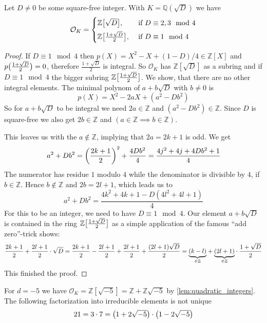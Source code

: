 \begin{lemma}\label{lem:quadratic_integers}
	Let $D\neq 0$ be some square-free integer.
	With $K=\mathbb{Q}(\sqrt{D})$ we have
	\[
		\mathcal{O}_K = \begin{cases}
			\mathbb{Z}\benbrace[\big]{\sqrt{D}}, &\text{ if }D \equiv 2,3 \mod 4\\[1ex]
			\mathbb{Z}\benbrace[\big]{\frac{1+ \sqrt{D}}{2}}, &\text{ if } D \equiv 1 \mod 4
		\end{cases}
	\]
\end{lemma}
\begin{proof}
	If $D \equiv 1 \mod 4$ then $p(X)= X^2 -X + (1-D)/4 \in \mathbb{Z}[X]$ and $p \enbrace[\big]{\frac{1+ \sqrt{D}}{2}}=0$, therefore $\frac{1+ \sqrt{D}}{2}$ is integral.
	So $\mathcal{O}_K$ has $\mathbb{Z}[\sqrt{D}]$ as a subring and if $D \equiv 1 \mod 4$ the bigger subring $\mathbb{Z}\benbrace[\big]{\frac{1+ \sqrt{D}}{2}}$.
	We show, that there are no other integral elements.
	The minimal polynom of $a + b \sqrt{D}$ with $b\neq 0$ is
	\[
		p(X) = X^2 -2aX + (a^2 - Db^2)
	\]
	So for $a +b \sqrt{D}$ to be integral we need $2a \in \mathbb{Z}$ and $(a^2 - Db^2) \in \mathbb{Z}$.
	Since $D$ is square-free we also get $2b \in \mathbb{Z}$ and $(a \in \mathbb{Z} \implies b \in \mathbb{Z})$.

	This leaves us with the $a \notin \mathbb{Z}$, implying that $2a=2k+1$ is odd.
	We get
	\[
		a^2 + Db^2 = \enbrace*{\frac{2k+1}{2}}^2 + \frac{4Db^2}{4} = \frac{4j^2 +4j + 4 Db^2 + 1}{4}
	\]
	The numerator has residue $1$ modulo $4$ while the denominator is divisible by $4$, if $b \in \mathbb{Z}$.
	Hence $b \notin \mathbb{Z}$ and $2b =2 l + 1$, which leads us to
	\[
		a^2 + Db^2 = \frac{4k^2 +4k +1 - D(4l^2 + 4l +1)}{4}
	\]
	For this to be an integer, we need to have $D \equiv 1 \mod 4$.
	Our element $a + b \sqrt{D}$ is contained in the ring $\mathbb{Z}\benbrace[\big]{\frac{1+ \sqrt{D}}{2}}$ as a simple application of the famous \enquote{add zero}-trick shows:
	\[
		\frac{2k+1}{2} + \frac{2l+1}{2} \cdot \sqrt{D} = \frac{2k+1}{2} - \frac{2l+1}{2} + \frac{2l+1}{2} + \frac{(2l+1)\sqrt{D}}{2} = \Underbrace{(k-l)}{\in \mathbb{Z}} + \Underbrace{(2l+1)}{\in \mathbb{Z}} \cdot \frac{1+ \sqrt{D}}{2}
	\]
	This finished the proof.
\end{proof}

\begin{example}
	For $d=-5$ we have $\mathcal{O}_K = \mathbb{Z}[\sqrt{-5}] = \mathbb{Z} + \mathbb{Z}\sqrt{-5}$ by \cref{lem:quadratic_integers}.
	The following factorization into irreducible elements is not unique
	\[
		21 = 3 \cdot 7 = \enbrace*{1+ 2 \sqrt{-5}} \cdot \enbrace*{1 - 2 \sqrt{-5}}
	\]
\end{example}

